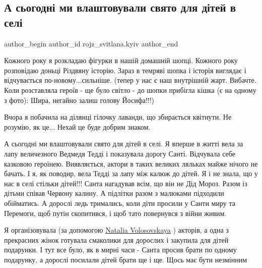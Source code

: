  
 
 
 
 
 
\subsection{А сьогодні ми влаштовували свято для дітей в селі}
\label{sec:25_12_2022.fb.rojz_svitlana.kyiv.1.svjato_dity_shopka}
 
\ifcmt
 author_begin
   author_id rojz_svitlana.kyiv
 author_end
\fi

Кожного року я розкладаю фігурки в нашій домашній шопці. Кожного року
розповідаю доньці Різдвяну історію. Зараз в темряві шопка і історія виглядає і
відчувається по-новому...сильніше. (тепер у нас є наш внутрішній жарт. Вибачте.
Коли розставляла героїв - ще було світло - до шопки прибігла кішка (є на одному
з фото): Шира, негайно залиш голову Йосифа!!!)  

Вчора я побачила на ділянці гілочку лаванди, що збирається квітнути. Не
розумію, як це... Нехай це буде добрим знаком. 

А сьогодні ми влаштовували свято для дітей в селі. Я вперше в житті вела за
лапу величезного Ведмедя Тедді і показувала дорогу Санті. Відчувала себе
казковою героїнею. Виявляється, актори в таких великих ляльках майже нічого не
бачать. І я, як поводир, вела Тедді за лапу між калюж до дітей. Я і не знала,
що у нас в селі стільки дітей!!! Санта нагадував всім, що він не Дід Мороз.
Разом із дітьми співав Червону калину. А підлітки разом з малюками підходили
обійматись. А дорослі ледь тримались, коли діти просили у Санти миру та
Перемоги, щоб путін скопитився, і щоб тато повернувся з війни живим. 

Я організовувала (за допомогою
\href{https://www.facebook.com/natalia.volosovskaya}{Natalia Volosovskaya} )
акторів, а одна з прекрасних жінок готувала смаколики для дорослих і закупила
для дітей подарунки. І тут все було, як в мирні часи - Санта просив брати по
одному подарунку, а дорослі посилали дітей брати ще і ще. Щось має бути
незмінним 🙂

